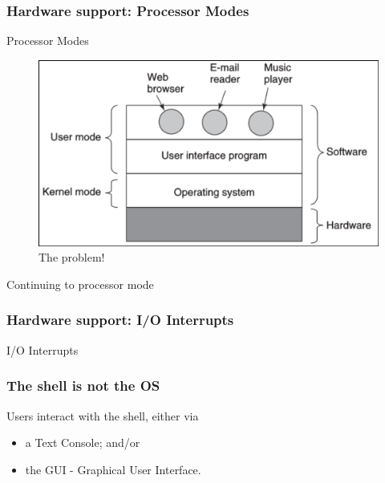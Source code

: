 \begin{frame}
    \frametitle{Hardware support: Processor Modes}
    
    Processor Modes
    \begin{figure}
        \includegraphics[scale=0.5]{images/101.png}
        \caption{The problem!}
    \end{figure}
    Continuing to processor mode

\end{frame}


\begin{frame}
    \frametitle{Hardware support: I/O Interrupts}
    
    I/O Interrupts
    
\end{frame}

\begin{frame}
    \frametitle{The shell is not the OS}
    
    Users interact with the shell, either via 
    \begin{itemize}
        \item a Text Console; and/or
        \item the GUI - Graphical User Interface.
    \end{itemize}

\end{frame}


